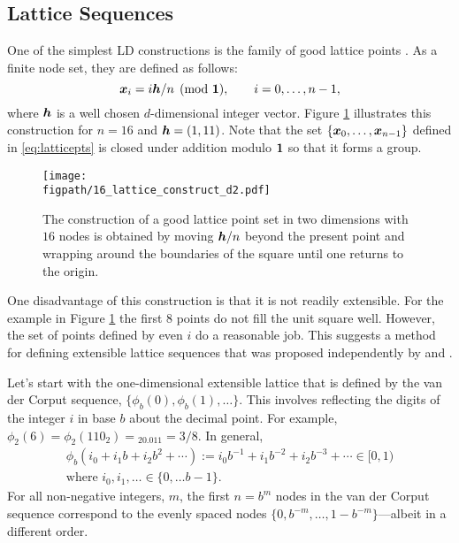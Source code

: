 \documentclass{svproc}
\newcommand{\figpath}{Figures}
\begin{document}
\subsection{Lattice Sequences} \label{sec:lattice}
One of the simplest LD constructions is the family of good lattice points \cite{DicEtal22a,SloJoe94}.  As a finite node set, they are defined as follows:
\begin{equation} \label{eq:latticepts}
	{\boldsymbol{x}}_i = i{\boldsymbol{h}}/n \pmod {{\boldsymbol{1}}}, \qquad i = 0, \ldots, n-1,
\end{equation}
where ${\boldsymbol{h}}$ is a well chosen $d$-dimensional integer vector. Figure \ref{fig:latticeconstruct} illustrates this construction for $n = 16$ and ${\boldsymbol{h}} = (1,11)$.  Note that the set $\{{\boldsymbol{x}}_0, \ldots, {\boldsymbol{x}}_{n-1}\}$ defined in \eqref{eq:latticepts} is closed under addition modulo ${\boldsymbol{1}}$ so that it forms a group.


\begin{figure}
	\centering
	\texttt{[image: \\figpath/16\_lattice\_construct\_d2.pdf]}
	\caption{The construction of a good lattice point set in two dimensions with $16$ nodes is obtained by moving ${\boldsymbol{h}}/n$ beyond the present point and wrapping around the boundaries of the square until one returns to the origin. \label{fig:latticeconstruct}}
\end{figure}


One disadvantage of this construction is that it is not readily extensible. For the example in Figure \ref{fig:latticeconstruct} the first $8$ points do not fill the unit square well.  However, the set of points defined by even $i$ do a reasonable job.  This suggests a method for defining extensible lattice sequences that was proposed independently by \cite{Mai81a} and \cite{HicEtal00}.

Let's start with the one-dimensional extensible lattice that is defined by the van der Corput sequence, $\{\phi_b(0), \phi_b(1), \ldots\}$.  This involves reflecting the digits of the integer $i$ in base $b$ about the decimal point.  For example, $\phi_2(6) = \phi_2(110_{2}) = {}_20.011 = 3/8$.  In general,
\begin{multline} \label{eq:vdc}
	\phi_b(i_0 + i_1b + i_2 b^2 + \cdots ) := i_0 b^{-1} + i_1 b^{-2} + i_2 b^{-3} + \cdots \in [0,1)
	\\
	 \text{where } i_0, i_1, \ldots \in \{0,\ldots b-1\}.
\end{multline}
For all non-negative integers, $m$, the first $n = b^m$ nodes in the van der Corput sequence correspond to the evenly spaced nodes $\{0, b^{-m}, \ldots, 1 - b^{-m} \}$---albeit in a different order.
\end{document}
